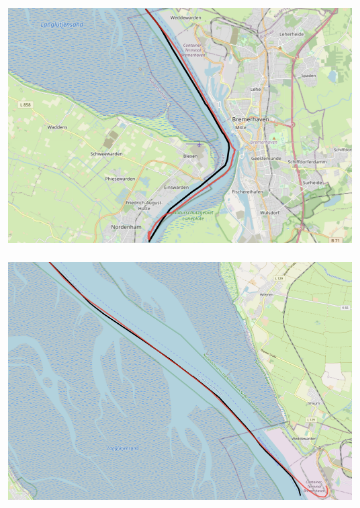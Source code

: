 \begin{figure}[H]
     \centering
     \begin{subfigure}[b]{0.48\textwidth}
         \centering
             \includegraphics[width=\textwidth]{images/ais/tracks/pred1.png}
             \caption{}
         \label{fig:double3}
     \end{subfigure}
          \hfill
               \begin{subfigure}[b]{0.48\textwidth}
         \centering
             \includegraphics[width=\textwidth]{images/ais/tracks/pred7.png}
              \caption{}
         \label{fig:double4}
     \end{subfigure}
\end{figure}

